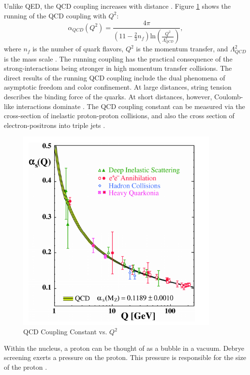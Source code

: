 Unlike QED, the QCD coupling increases with distance \cite{Bethke:2006ac}. Figure \ref{fig:runningQCDCoupling} shows the running of the QCD coupling with $Q^2$:
\begin{equation}
\alpha_{QCD}(Q^2) = \frac{4 \pi }{(11 - \frac{2}{3}n_f)\mathrm{ln}(\frac{Q^2}{\Lambda^2_{QCD}}) } ,
\end{equation}
where $n_f$ is the number of quark flavors, $Q^2$ is the momentum transfer, and  $\Lambda^2_{QCD}$ is the mass scale \cite{Deur:2016tte}. The running coupling has the practical consequence of the strong-interactions being stronger in high momentum transfer collisions. The direct results of the running QCD coupling include the dual phenomena of asymptotic freedom and color confinement. At large distances, string tension describes the binding force of the quarks. At short distances, however, Coulomb-like interactions dominate \cite{Bjorken:1968dy}. The QCD coupling constant can be measured via the cross-section of inelastic proton-proton collisions, and also the cross section of electron-positrons into triple jets \cite{Thomson:2013zua}. 
\begin{figure}[h!]
\begin{centering}
\includegraphics[width=4in]{Chapter1/importfigs/qcd_coupling_bethke.png}
\par\end{centering}
\caption{QCD Coupling Constant vs. $Q^2$ \cite{Bethke:2006ac} \label{fig:runningQCDCoupling}}
\end{figure}

Within the nucleus, a proton can be thought of as a bubble in a vacuum. Debrye screening exerts a pressure on the proton. This pressure is responsible for the size of the proton \cite{CGC2Lec}\cite{CGCandGlasma}.


